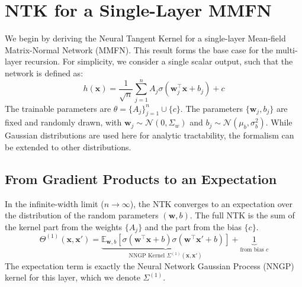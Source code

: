 \documentclass[a4paper]{article}
\begin{document}
\section{NTK for a Single-Layer MMFN}
\label{sec:single_layer_mmfn}
We begin by deriving the Neural Tangent Kernel for a single-layer Mean-field Matrix-Normal Network (MMFN). This result forms the base case for the multi-layer recursion. For simplicity, we consider a single scalar output, such that the network is defined as:
\begin{equation}
    h(\bm{x}) = \frac{1}{\sqrt{n}} \sum_{j=1}^n A_j \sigma(\bm{w}_j^\top \bm{x} + b_j) + c
\end{equation}
The trainable parameters are $\theta = \{A_j\}_{j=1}^n \cup \{c\}$. The parameters $\{\bm{w}_j, b_j\}$ are fixed and randomly drawn, with $\bm{w}_j \sim \mathcal{N}(0, \Sigma_w)$ and $b_j \sim \mathcal{N}(\mu_b, \sigma_b^2)$. While Gaussian distributions are used here for analytic tractability, the formalism can be extended to other distributions.

\subsection{From Gradient Products to an Expectation}
In the infinite-width limit ($n \to \infty$), the NTK converges to an expectation over the distribution of the random parameters $(\bm{w}, b)$. The full NTK is the sum of the kernel part from the weights $\{A_j\}$ and the part from the bias $\{c\}$.
\begin{equation}
\label{eq:ntk_expectation}
    \Theta^{(1)}(\bm{x}, \bm{x}') = \underbrace{\mathbb{E}_{\bm{w},b} \left[ \sigma(\bm{w}^\top \bm{x} + b)\sigma(\bm{w}^\top \bm{x}' + b) \right]}_{\text{NNGP Kernel } \Sigma^{(1)}(\bm{x}, \bm{x}')} + \underbrace{1}_{\text{from bias } c}
\end{equation}
The expectation term is exactly the Neural Network Gaussian Process (NNGP) kernel for this layer, which we denote $\Sigma^{(1)}$.
\end{document}

